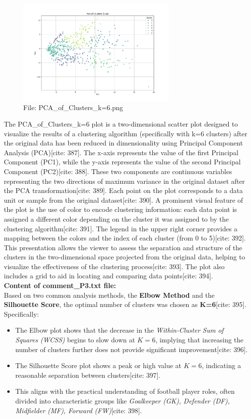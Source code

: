 \documentclass[12pt]{report}
\begin{document}
{{{\begin{figure}[h]
    \centering
    \includegraphics[width=300px]{PCA_of_Clusters_k=6.png}
    \caption{File: PCA\_of\_Clusters\_k=6.png}
    \label{fig:PCA}
\end{figure}
The PCA\_of\_Clusters\_k=6 plot is a two-dimensional scatter plot designed to visualize the results of a clustering algorithm (specifically with k=6 clusters) after the original data has been reduced in dimensionality using Principal Component Analysis (PCA)[cite: 387]. The x-axis represents the value of the first Principal Component (PC1), while the y-axis represents the value of the second Principal Component (PC2)[cite: 388]. These two components are continuous variables representing the two directions of maximum variance in the original dataset after the PCA transformation[cite: 389]. Each point on the plot corresponds to a data unit or sample from the original dataset[cite: 390]. A prominent visual feature of the plot is the use of color to encode clustering information: each data point is assigned a different color depending on the cluster it was assigned to by the clustering algorithm[cite: 391]. The legend in the upper right corner provides a mapping between the colors and the index of each cluster (from 0 to 5)[cite: 392]. This presentation allows the viewer to assess the separation and structure of the clusters in the two-dimensional space projected from the original data, helping to visualize the effectiveness of the clustering process[cite: 393]. The plot also includes a grid to aid in locating and comparing data points[cite: 394]. \\
\textbf{Content of comment\_P3.txt file:}\\
Based on two common analysis methods, the \textbf{Elbow Method} and the \textbf{Silhouette Score}, the optimal number of clusters was chosen as \textbf{K=6}[cite: 395]. Specifically:
\begin{itemize}
  \item The Elbow plot shows that the decrease in the \textit{Within-Cluster Sum of Squares (WCSS)} begins to slow down at $K=6$, implying that increasing the number of clusters further does not provide significant improvement[cite: 396].
  \item The Silhouette Score plot shows a peak or high value at $K=6$, indicating a reasonable separation between clusters[cite: 397].
  \item This aligns with the practical understanding of football player roles, often divided into characteristic groups like \textit{Goalkeeper (GK), Defender (DF), Midfielder (MF), Forward (FW)}[cite: 398].
\end{itemize}

}}}
\end{document}
